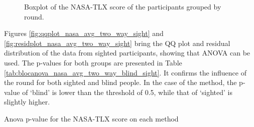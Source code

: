 \begin{figure}[!htb]
\begin{minipage}{0.45\textwidth}
        \caption{Boxplot of the NASA-TLX score of the participants grouped by round.}
        \label{fig:boxplot_noBase_nasa_4_rounds}
    \end{minipage}
\end{figure}

Figures \ref{fig:qqplot_nasa_avg_two_way_sight} and \ref{fig:residplot_nasa_avg_two_way_sight} bring the QQ plot and residual distribution of the data from sighted participants, showing that ANOVA can be used. The p-values for both groups are presented in Table \ref{tab:blocanova_nasa_avg_two_way_blind_sight}. It confirms the influence of the round for both sighted and blind people. In the case of the method, the p-value of ‘blind’ is lower than the threshold of 0.5, while that of ‘sighted’ is slightly higher.

\begin{table}[!thb]
    \caption{Anova p-value for the NASA-TLX score on each method}
    \label{tab:blocanova_nasa_avg_two_way_blind_sight}
    \begin{minipage}{0.45\textwidth}
        
    \end{minipage}
    \begin{minipage}{0.45\textwidth}
            
    \end{minipage}
\end{table}


